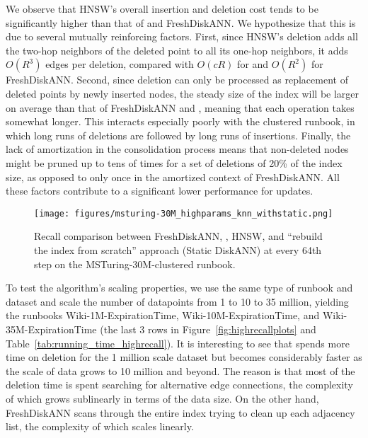 We observe that HNSW's overall insertion and deletion cost tends to be significantly
higher than that of \name and FreshDiskANN. We hypothesize that this is due to
several mutually reinforcing factors.
First, since HNSW's deletion adds all the two-hop neighbors of the deleted point
to all its one-hop neighbors, it adds $O(R^3)$ edges per deletion,
compared with $O(cR)$ for \name and $O(R^2)$ for FreshDiskANN.
Second, since deletion can only be processed as replacement of
deleted points by newly inserted nodes, the steady size of the
index will be larger on average than that of FreshDiskANN and \name,
meaning that each operation takes somewhat longer.
This interacts especially poorly with the clustered runbook,
in which long runs of deletions are followed by long runs of insertions.
Finally, the lack of amortization in the consolidation process means that
non-deleted nodes might be pruned up to tens of times for a set of
deletions of 20\% of the index size, as opposed to only once in the amortized context of FreshDiskANN.
All these factors contribute to a significant lower performance for updates.

\begin{figure}
    \centering
    \texttt{[image: figures/msturing-30M\_highparams\_knn\_withstatic.png]}
    \vspace{-5pt}
    \caption{Recall comparison between FreshDiskANN, \name, HNSW, and ``rebuild the index from scratch'' approach (Static DiskANN) at every 64th step on the MSTuring-30M-clustered runbook.
    }
    \label{fig:build_scratch}
\end{figure}


To test the algorithm's scaling properties, we use the same type of runbook and dataset
and scale the number of datapoints from 1 to 10 to 35 million, yielding the runbooks
Wiki-1M-ExpirationTime, Wiki-10M-ExpirationTime, and Wiki-35M-ExpirationTime
(the last 3 rows in Figure~\ref{fig:highrecallplots} and Table~\ref{tab:running_time_highrecall}).
It is interesting to see that \name spends more time on deletion
for the 1 million scale dataset but becomes considerably faster as the scale of data
grows to 10 million and beyond. The reason is that most of 
the deletion time is spent searching for alternative edge connections,
the complexity of which grows sublinearly
in terms of the data size. On the other hand, FreshDiskANN scans through the
entire index trying to clean up each adjacency list, the complexity of which scales linearly.


